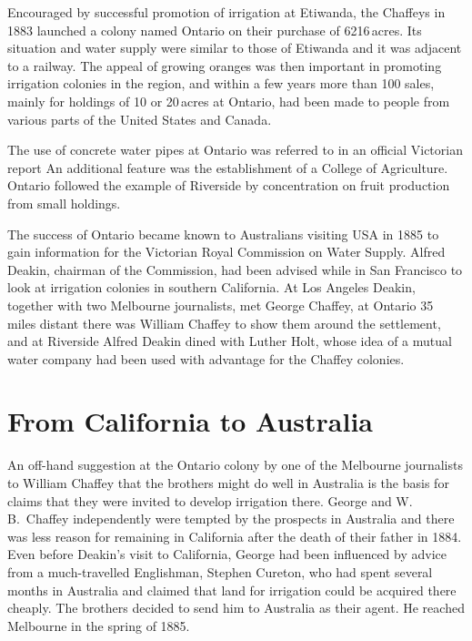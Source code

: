 Encouraged by successful promotion of irrigation at Etiwanda, the
Chaffeys in 1883 laun\-ch\-ed a colony named Ontario
 on their purchase of
6216\,acres.  Its situation and water supply were similar to those of
Etiwanda and it was adjacent to a railway.
The appeal of growing oranges was then important in
promoting irrigation colonies in the region, and within a few years
more than 100 sales, mainly for holdings of 10 or 20\,acres at
Ontario, had been made to people from various parts of the United
States and Canada.

The use of concrete water pipes at Ontario was referred to in an
official Victorian report An additional feature was the establishment
of a College of Agriculture.  Ontario followed the example of
Riverside by concentration on fruit production from small
holdings.

The success of Ontario became known to Australians visiting
USA in 1885 to gain information for the Victorian Royal
Commission on Water Supply. Alfred Deakin,   chairman of the Commission,
had been advised while in San Francisco to look at irrigation colonies
in southern California.  At Los Angeles Deakin,
together with two Melbourne journalists, met George Chaffey, at Ontario
35 miles distant there was William Chaffey to show them around the
settlement, and at Riverside Alfred Deakin dined with Luther Holt,
  whose idea of a mutual water company had been used
with advantage for the Chaffey colonies.

\section*{From California to Australia}

An off-hand suggestion at the Ontario colony by one of the Melbourne
journalists to William Chaffey that the brothers might do well in
Australia is the basis for claims that they were invited to develop
irrigation there.  George and W.\,B.~Chaffey independently were
tempted by the prospects in Australia and there was less reason for
remaining in California after the death of their father in 1884.  Even
before Deakin's visit to California, George had been influenced by
advice from a much-travelled Englishman, Stephen Cureton,
 who had
spent several months in Australia and claimed that land for irrigation
could be acquired there cheaply.  The brothers decided to send him to
Australia as their agent.  He reached Melbourne in the spring of
1885.

